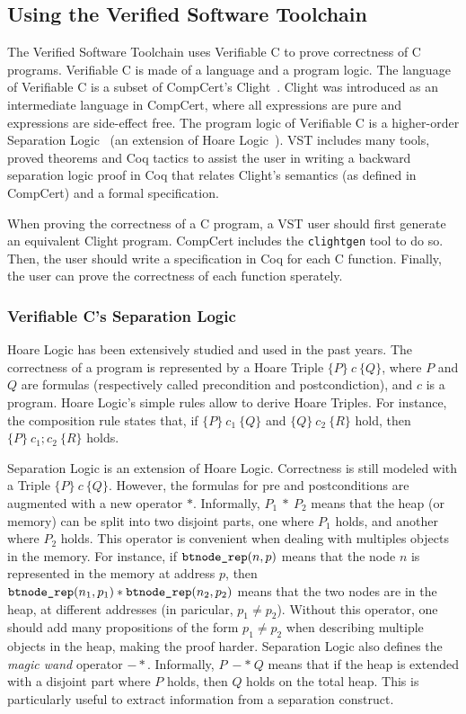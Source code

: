 \subsection{Using the Verified Software Toolchain}
The Verified Software Toolchain uses Verifiable C to prove correctness of C programs.
Verifiable C is made of a language and a program logic.
The language of Verifiable C is a subset of CompCert's Clight~\cite{clight}.
Clight was introduced as an intermediate language in CompCert, where all expressions are pure and expressions are side-effect free.
The program logic of Verifiable C is a higher-order Separation Logic~\cite{sep} (an extension of Hoare Logic~\cite{hoare}).
VST includes many tools, proved theorems and Coq tactics to assist the user in writing a backward separation logic proof in Coq that relates Clight's semantics (as defined in CompCert) and a formal specification.

When proving the correctness of a C program, a VST user should first generate an equivalent Clight program.
CompCert includes the \texttt{clightgen} tool to do so. Then, the user should write a specification in Coq for each C function.
Finally, the user can prove the correctness of each function sperately.

\subsubsection{Verifiable C's Separation Logic}
Hoare Logic has been extensively studied and used in the past years.
The correctness of a program is represented by a Hoare Triple $\{P\}~c~\{Q\}$, where $P$ and $Q$ are formulas (respectively called precondition and postcondiction), and $c$ is a program.
Hoare Logic's simple rules allow to derive Hoare Triples. For instance, the composition rule states that, if $\{P\}~c_1~\{Q\}$ and $\{Q\}~c_2~\{R\}$ hold, then $\{P\}~c_1;c_2~\{R\}$ holds.

Separation Logic is an extension of Hoare Logic. Correctness is still modeled with a Triple $\{P\}~c~\{Q\}$. However, the formulas for pre and postconditions are augmented with a new operator $*$.
Informally, $P_1~*~P_2$ means that the heap (or memory) can be split into two disjoint parts, one where $P_1$ holds, and another where $P_2$ holds.
This operator is convenient when dealing with multiples objects in the memory.
For instance, if $\texttt{btnode\_rep}(n,p)$ means that the node $n$ is represented in the memory at address $p$, then $\texttt{btnode\_rep}(n_1,p_1)*\texttt{btnode\_rep}(n_2,p_2)$ means that the two nodes are in the heap, at different addresses (in paricular, $p_1\neq p_2$).
Without this operator, one should add many propositions of the form $p_1\neq p_2$ when describing multiple objects in the heap, making the proof harder.
Separation Logic also defines the \textit{magic wand} operator $-*$. Informally, $P~-*~Q$ means that if the heap is extended with a disjoint part where $P$ holds, then $Q$ holds on the total heap.
This is particularly useful to extract information from a separation construct. 


